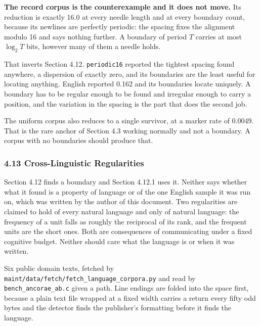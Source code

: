 \noindent\textbf{The record corpus is the counterexample and it does not move.} Its reduction is exactly 16.0 at every needle length and at every boundary count, because its newlines are perfectly periodic: the spacing fixes the alignment modulo 16 and says nothing further. A boundary of period \(T\) carries at most \(\log_2 T\) bits, however many of them a needle holds.

That inverts Section 4.12. \texttt{periodic16} reported the tightest spacing found anywhere, a dispersion of exactly zero, and its boundaries are the least useful for locating anything. English reported 0.162 and its boundaries locate uniquely. A boundary has to be regular enough to be found and irregular enough to carry a position, and the variation in the spacing is the part that does the second job.

The uniform corpus also reduces to a single survivor, at a marker rate of 0.0049. That is the rare anchor of Section 4.3 working normally and not a boundary. A corpus with no boundaries should produce that.

\subsubsection{4.13 Cross-Linguistic Regularities}

Section 4.12 finds a boundary and Section 4.12.1 uses it. Neither says whether what it found is a property of language or of the one English sample it was run on, which was written by the author of this document. Two regularities are claimed to hold of every natural language and only of natural language: the frequency of a unit falls as roughly the reciprocal of its rank, and the frequent units are the short ones. Both are consequences of communicating under a fixed cognitive budget. Neither should care what the language is or when it was written.

Six public domain texts, fetched by \texttt{maint/\allowbreak{}data/\allowbreak{}fetch/\allowbreak{}fetch\_\allowbreak{}language\_\allowbreak{}corpora.\allowbreak{}py} and read by \texttt{bench\_\allowbreak{}ancorae\_\allowbreak{}ab.\allowbreak{}c} given a path. Line endings are folded into the space first, because a plain text file wrapped at a fixed width carries a return every fifty odd bytes and the detector finds the publisher's formatting before it finds the language.

